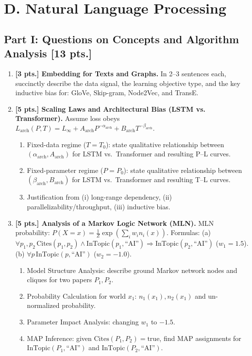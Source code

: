 \documentclass[11pt,a4paper]{article}
\begin{document}
\section*{D. Natural Language Processing}

\subsection*{Part I: Questions on Concepts and Algorithm Analysis [13 pts.]}

\begin{enumerate}[label=\textbf{\arabic*.}]
    \item \textbf{[3 pts.] Embedding for Texts and Graphs.} In 2--3 sentences each, succinctly describe the data signal, the learning objective type, and the key inductive bias for: GloVe, Skip-gram, Node2Vec, and TransE.

    \item \textbf{[5 pts.] Scaling Laws and Architectural Bias (LSTM vs. Transformer).}
    Assume loss obeys $L_{\text{arch}}(P, T) = L_\infty + A_{\text{arch}} P^{-\alpha_{\text{arch}}} + B_{\text{arch}} T^{-\beta_{\text{arch}}}$.
    \begin{enumerate}[label=(\a*)]
        \item Fixed-data regime ($T = T_0$): state qualitative relationship between $(\alpha_{\text{arch}}, A_{\text{arch}})$ for LSTM vs.\ Transformer and resulting P--L curves.
        \item Fixed-parameter regime ($P = P_0$): state qualitative relationship between $(\beta_{\text{arch}}, B_{\text{arch}})$ for LSTM vs.\ Transformer and resulting T--L curves.
        \item Justification from (i) long-range dependency, (ii) parallelizability/throughput, (iii) inductive bias.
    \end{enumerate}

    \item \textbf{[5 pts.] Analysis of a Markov Logic Network (MLN).}
    MLN probability: $P(X = x) = \frac{1}{Z} \exp\left(\sum_i w_i n_i(x)\right)$.
    Formulas:
    (a) $\forall p_1, p_2 \, \text{Cites}(p_1, p_2) \land \text{InTopic}(p_1, \text{``AI''}) \Rightarrow \text{InTopic}(p_2, \text{``AI''})$ ($w_1 = 1.5$).
    (b) $\forall p \, \text{InTopic}(p, \text{``AI''})$ ($w_2 = -1.0$).
    \begin{enumerate}[label=(\alph*)]
        \item Model Structure Analysis: describe ground Markov network nodes and cliques for two papers $P_1, P_2$.
        \item Probability Calculation for world $x_1$: $n_1(x_1), n_2(x_1)$ and un-normalized probability.
        \item Parameter Impact Analysis: changing $w_1$ to $-1.5$.
        \item MAP Inference: given $\text{Cites}(P_1, P_2) = \text{true}$, find MAP assignments for $\text{InTopic}(P_1, \text{``AI''})$ and $\text{InTopic}(P_2, \text{``AI''})$.
    \end{enumerate}
\end{enumerate}
\end{document}
